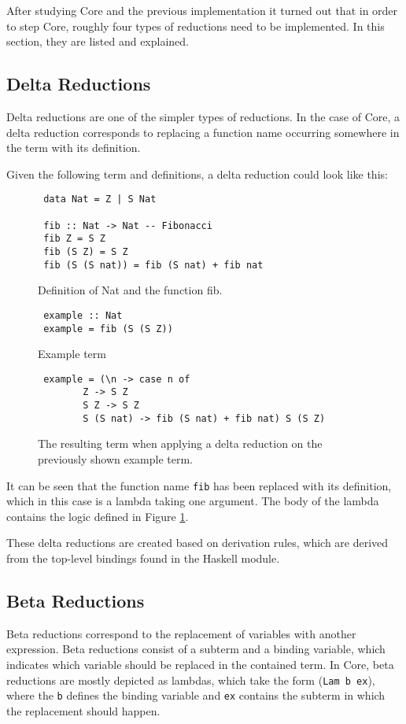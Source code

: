 After studying Core and the previous implementation it turned out that in order to step Core,
roughly four types of reductions need to be implemented.
In this section, they are listed and explained.

\subsection{Delta Reductions}
Delta reductions are one of the simpler types of reductions.
In the case of Core,
a delta reduction corresponds to replacing a function name occurring somewhere in the term with its definition.

Given the following term and definitions, a delta reduction could look like this:

\begin{figure}[!ht]
\begin{verbatim}
 data Nat = Z | S Nat

 fib :: Nat -> Nat -- Fibonacci
 fib Z = S Z
 fib (S Z) = S Z
 fib (S (S nat)) = fib (S nat) + fib nat
\end{verbatim}
    \caption{Definition of Nat and the function fib.}
    \label{fig:deltaReductionExample}
\end{figure}

\begin{figure}[!ht]
\begin{verbatim}
 example :: Nat
 example = fib (S (S Z))
\end{verbatim}
    \caption{Example term}
\end{figure}

\begin{figure}[!ht]
\begin{verbatim}
 example = (\n -> case n of
        Z -> S Z
        S Z -> S Z
        S (S nat) -> fib (S nat) + fib nat) S (S Z)
\end{verbatim}
    \caption{The resulting term when applying a delta reduction on the previously shown example term.}
\end{figure}

It can be seen that the function name \texttt{fib} has been replaced with its definition,
which in this case is a lambda taking one argument.
The body of the lambda contains the logic defined in Figure \ref*{fig:deltaReductionExample}.

These delta reductions are created based on derivation rules,
which are derived from the top-level bindings found in the Haskell module.

\subsection{Beta Reductions}
Beta reductions correspond to the replacement of variables with another expression.
Beta reductions consist of a subterm and a binding variable,
which indicates which variable should be replaced in the contained term.
In Core, beta reductions are mostly depicted as lambdas,
which take the form (\texttt{Lam b ex}),
where the \texttt{b} defines the binding variable and \texttt{ex} contains the subterm in which the replacement should happen.

